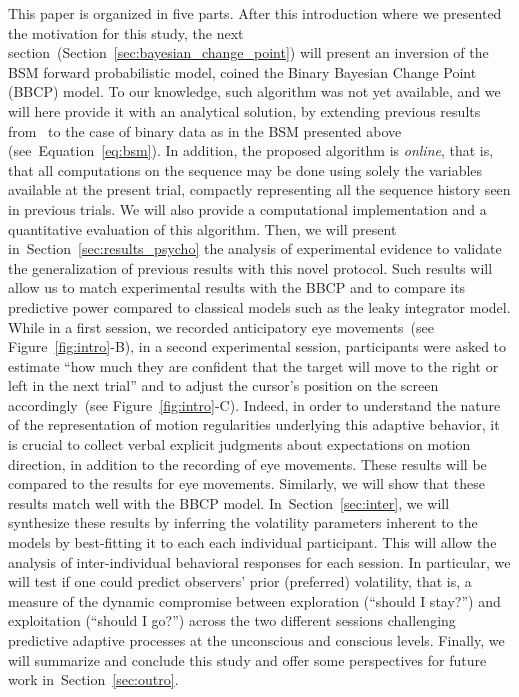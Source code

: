 \documentclass[12pt,english]{article}%
\newcommand{\citet}[1]{\textcite{#1}}
\newcommand{\seeFig}[1]{Figure~\ref{fig:#1}}
\newcommand{\seeEq}[1]{Equation~\ref{eq:#1}}
\newcommand{\seeSec}[1]{Section~\ref{sec:#1}}
\begin{document}
This paper is organized in five parts.
After this introduction where we presented the motivation for this study,
the next section~(\seeSec{bayesian_change_point}) will present
an inversion of the BSM forward probabilistic model,
coined the Binary Bayesian Change Point (BBCP) model.
To our knowledge, such algorithm was not yet available, and
we will here provide it with an analytical solution,
by extending previous results from~\citet{AdamsMackay2007}
to the case of binary data as in the BSM presented above (see~\seeEq{bsm}).
In addition, the proposed algorithm is \emph{online},
that is, that all computations on the sequence may be done
using solely the variables available at the present trial,
compactly representing all the sequence history seen in previous trials.
We will also provide a computational implementation
and a quantitative evaluation of this algorithm.
Then, we will present in~\seeSec{results_psycho} the analysis of experimental evidence
to validate the generalization of previous results %
with this novel protocol. %
Such results will allow us to match experimental results with the BBCP
and to compare its predictive power compared to classical models such as the leaky integrator model.
While in a first session, we recorded anticipatory eye movements~(see \seeFig{intro}-B), 
in a second experimental session, participants were asked to estimate
``how much they are confident that
the target will move to the right or left in the next trial'' and
to adjust the cursor's position on the screen accordingly~(see \seeFig{intro}-C).
Indeed, in order to understand the nature of the representation of motion regularities underlying this adaptive behavior, 
it is crucial to collect verbal explicit judgments 
about expectations on motion direction, 
in addition to the recording of eye movements.
These results will be compared to the results for eye movements.
Similarly, we will show that these results match well
with the BBCP model.
In~\seeSec{inter}, we will synthesize these results
by inferring the volatility parameters inherent to the models
by best-fitting it to each each individual participant. 
This will allow the analysis of inter-individual behavioral responses for each session.
In particular, we will test if one could predict observers' prior (preferred) volatility,
that is, a measure of the dynamic compromise between exploration (``should I stay?'')
and exploitation (``should I go?'')
across the two different sessions challenging predictive adaptive processes
at the unconscious and conscious levels.
Finally, we will summarize and conclude this study and
offer some perspectives for future work in~\seeSec{outro}.
%
\end{document}
